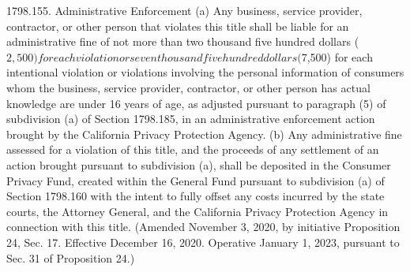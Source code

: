 1798.155.  Administrative Enforcement
(a) Any business, service provider, contractor, or other person that violates this title shall be liable for an administrative fine of not more than two thousand five hundred dollars ($2,500) for each violation or seven thousand five hundred dollars ($7,500) for each intentional violation or violations involving the personal information of consumers whom the business, service provider, contractor, or other person has actual knowledge are under 16 years of age, as adjusted pursuant to paragraph (5) of subdivision (a) of Section 1798.185, in an administrative enforcement action brought by the California Privacy Protection Agency.
(b) Any administrative fine assessed for a violation of this title, and the proceeds of any settlement of an action brought pursuant to subdivision (a), shall be deposited in the Consumer Privacy Fund, created within the General Fund pursuant to subdivision (a) of Section 1798.160 with the intent to fully offset any costs incurred by the state courts, the Attorney General, and the California Privacy Protection Agency in connection with this title.
(Amended November 3, 2020, by initiative Proposition 24, Sec. 17. Effective December 16, 2020. Operative January 1, 2023, pursuant to Sec. 31 of Proposition 24.)

